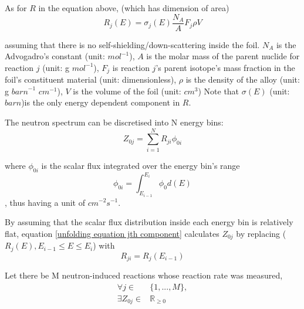 \documentclass[a4paper, 12pt]{article}
\begin{document}

As for $R$ in the equation above, (which has dimension of area)
\begin{equation}
    R_j(E) =\sigma_{j}(E) \frac{N_A } {A} F_j \rho V
\end{equation}

assuming that there is no self-shielding/down-scattering inside the foil.
$N_A$ is the Advogadro's constant (unit: ${mol}^{-1}$),
$A$ is the molar mass of the parent nuclide for reaction $j$ (unit: g ${mol}^{-1}$),
$F_j$ is reaction $j$'s parent isotope's mass fraction in the foil's constituent material (unit: dimensionless),
$\rho$ is the density of the alloy (unit: g ${barn}^{-1}$ ${cm}^{-1}$),
$V$ is the volume of the foil (unit: ${cm}^3$) Note that $\sigma(E)$ (unit: $barn$)is the only energy dependent component in $R$. %

The neutron spectrum can be discretised into N energy bins:
\begin{equation} \label{unfolding equation jth component}
    Z_{0j}= \sum_{i=1}^{N} R_{ji} \phi_{0i}
\end{equation}

where $\phi_{0i}$ is the scalar flux integrated over the energy bin's range 
\begin{equation}
    \phi_{0i} = \int_{E_{i-1}}^{E_i} \phi_{0} d(E)
\end{equation}
, thus having a unit of $cm^{-2} s^{-1}$.

By assuming that the scalar flux distribution inside each energy bin is relatively flat, equation \ref{unfolding equation jth component} calculates $Z_{0j}$ by replacing ($R_j (E), E_{i-1}\le E\le E_{i}$) with 
\begin{equation}
    R_{ji}=R_j (E_{i-1})
\end{equation}

Let there be M neutron-induced reactions whose reaction rate was measured,
\begin{equation}
\begin{split}
    \forall j \in & \{ 1, ..., M \},  \\
    \exists Z_{0j} \in & \mathbb R_{\ge 0}
\end{split}
\end{equation}
\end{document}
